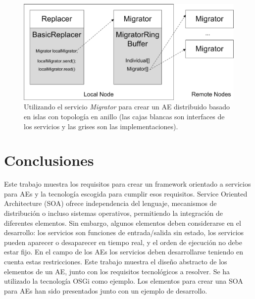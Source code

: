 \documentclass[runningheads]{llncs}
\begin{document}
\begin{figure}[ht] 
\begin{center} 
\includegraphics[scale=0.5]{images/migrator.eps}
\end{center} 
\caption{Utilizando el servicio {\em Migrator} para crear un AE distribuido basado en islas con topología en anillo (las cajas blancas son interfaces de los servicios y las grises son las implementaciones).} 
\label{MIGRATOR} 
\end{figure} 


\section{Conclusiones}
\label{sec:conclusions}
Este trabajo muestra los requisitos para crear un framework orientado a servicios para AEs y la tecnología escogida para cumplir esos requisitos.  Service Oriented Architecture (SOA) ofrece independencia del lenguaje, mecanismos de distribución o incluso sistemas operativos, permitiendo la integración de diferentes elementos. Sin embargo, algunos elementos deben considerarse en el desarrollo: los servicios son funciones de entrada/salida sin estado, los servicios pueden aparecer o desaparecer en tiempo real, y el orden de ejecución no debe estar fijo. En el campo de los AEs los servicios deben desarrollarse teniendo en cuenta estas restricciones. Este trabajo muestra el diseño abstracto de los elementos de un AE, junto con los requisitos tecnológicos a resolver. Se ha utilizado la tecnología OSGi como ejemplo. Los elementos para crear una SOA para AEs han sido presentados junto con un ejemplo de desarrollo.
\end{document}
